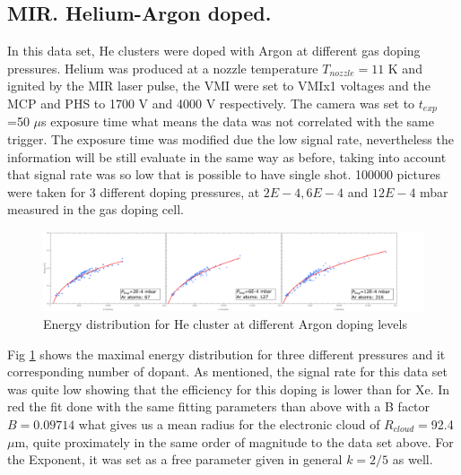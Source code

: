 \subsection{MIR. Helium-Argon doped.}

In this data set, He clusters were doped with Argon at different gas doping pressures. Helium was produced at a nozzle temperature $T_{nozzle}= 11$ K and ignited by the MIR laser pulse, the VMI were set to VMIx1 voltages and the MCP and PHS to 1700 V and 4000 V respectively. The camera was set to $t_{exp}$=50 $\mu$s exposure time what means the data was not correlated with the same trigger. The exposure time was modified due the low signal rate, nevertheless the information will be still evaluate in the same way  as before, taking into account that signal rate was so low that is possible to have single shot.  100000 pictures were taken for 3 different doping pressures, at $2E-4, 6E-4$ and $12E-4$ mbar measured in the gas doping cell. 

\begin{figure}[h!]
\label{fig:HeArEnergydistr}
\centering
\includegraphics[width=17cm]{../Images/results/MIR_He_ArDop/pointfits.png}
\caption[He-Ar Dop distribution]{Energy distribution for He  cluster at different Argon doping levels}
\label{fig:HeArEnergydistr}
\end{figure}

Fig \ref{fig:HeArEnergydistr} shows the maximal energy distribution for three different pressures and it corresponding number of dopant. As mentioned, the signal rate for this data set was quite low showing that the efficiency for this doping is lower than for Xe. In red the fit done with the same fitting parameters than above with a B factor $B=0.09714$ what gives us a mean radius for the electronic cloud of  $R_{cloud}=$92.4 $\mu$m, quite proximately in the same order of magnitude to the data set above. For the Exponent, it was set as a free parameter given in general $k=2/5$ as well. 

